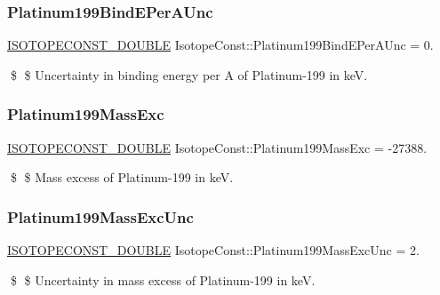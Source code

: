 \subsubsection{\texorpdfstring{Platinum199\+Bind\+E\+Per\+A\+Unc}{Platinum199BindEPerAUnc}}
{\footnotesize\ttfamily \mbox{\hyperlink{group___isotope_const-_macros_ga8f45a7272ce02c0b4c65c44636ed719a}{I\+S\+O\+T\+O\+P\+E\+C\+O\+N\+S\+T\+\_\+\+D\+O\+U\+B\+LE}} Isotope\+Const\+::\+Platinum199\+Bind\+E\+Per\+A\+Unc = 0.}

\$ \$ Uncertainty in binding energy per A of Platinum-\/199 in keV. \mbox{\label{group___isotope_const-_platinum-_pt199_ga26b3a73b2679df7d236051d0292ddc21}} 
\subsubsection{\texorpdfstring{Platinum199\+Mass\+Exc}{Platinum199MassExc}}
{\footnotesize\ttfamily \mbox{\hyperlink{group___isotope_const-_macros_ga8f45a7272ce02c0b4c65c44636ed719a}{I\+S\+O\+T\+O\+P\+E\+C\+O\+N\+S\+T\+\_\+\+D\+O\+U\+B\+LE}} Isotope\+Const\+::\+Platinum199\+Mass\+Exc = -\/27388.}

\$ \$ Mass excess of Platinum-\/199 in keV. \mbox{\label{group___isotope_const-_platinum-_pt199_ga1dd90217f2317737b7b9fd5eebaa87de}} 
\subsubsection{\texorpdfstring{Platinum199\+Mass\+Exc\+Unc}{Platinum199MassExcUnc}}
{\footnotesize\ttfamily \mbox{\hyperlink{group___isotope_const-_macros_ga8f45a7272ce02c0b4c65c44636ed719a}{I\+S\+O\+T\+O\+P\+E\+C\+O\+N\+S\+T\+\_\+\+D\+O\+U\+B\+LE}} Isotope\+Const\+::\+Platinum199\+Mass\+Exc\+Unc = 2.}

\$ \$ Uncertainty in mass excess of Platinum-\/199 in keV. \mbox{\label{group___isotope_const-_platinum-_pt199_ga5b602ae048ecfbd82ec63bda8c08be93}} 
